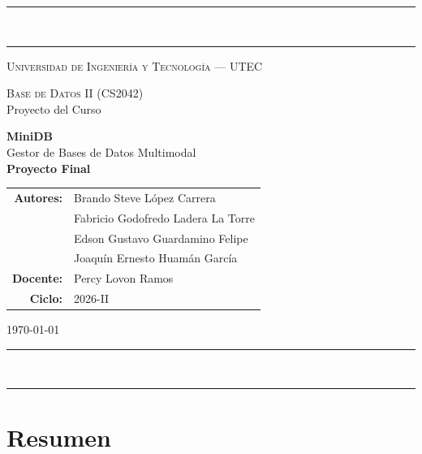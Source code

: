 \documentclass[11pt]{article}
\begin{document}
\begin{titlepage}
\begin{center}
{\color{utecblue}\rule{\textwidth}{2.2pt}}\\[2.5pt]
{\color{utecblue!50}\rule{\textwidth}{0.6pt}}

\vspace{1.8cm}
{\large\scshape\color{grafito} Universidad de Ingeniería y Tecnología --- UTEC}

\vspace{2.2cm}
{\large\textsc{Base de Datos II (CS2042)}}\\[0.35cm]
{\color{grafito}\large Proyecto del Curso}

\vspace{1.4cm}
{\color{utecblue}\Huge\bfseries MiniDB}\\[0.45cm]
{\LARGE Gestor de Bases de Datos Multimodal}\\[1.1cm]
{\color{petroleo}\Large\bfseries Proyecto Final}

\vfill
\begin{tabular}{rl}
\textbf{Autores:} & Brando Steve López Carrera \\[2pt]
                  & Fabricio Godofredo Ladera La Torre \\[2pt]
                  & Edson Gustavo Guardamino Felipe \\[2pt]
                  & Joaquín Ernesto Huamán García \\[6pt]
\textbf{Docente:} & Percy Lovon Ramos \\[2pt]
\textbf{Ciclo:}   & 2026-II \\
\end{tabular}

\vspace{1.2cm}
{\color{grafito}\large \today}\\[0.6cm]
{\color{utecblue!50}\rule{\textwidth}{0.6pt}}\\[2.5pt]
{\color{utecblue}\rule{\textwidth}{2.2pt}}
\end{center}
\end{titlepage}

\tableofcontents
\newpage

\section*{Resumen}
\end{document}

